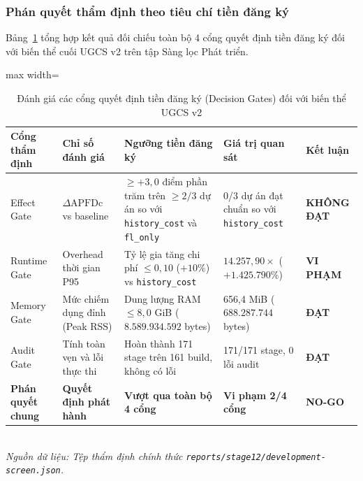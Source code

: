 \subsubsection{Phán quyết thẩm định theo tiêu chí tiền đăng ký}
\label{subsubsec:preregistered_decision}

Bảng~\ref{tab:decision_gates_evaluation} tổng hợp kết quả đối chiếu toàn bộ 4 cổng quyết định tiền đăng ký đối với biến thể cuối UGCS v2 trên tập Sàng lọc Phát triển.

\begin{table}[H]
\centering
\caption{Đánh giá các cổng quyết định tiền đăng ký (Decision Gates) đối với biến thể UGCS v2}
\label{tab:decision_gates_evaluation}
\small
\begin{adjustbox}{max width=\textwidth}
\begin{tabular}{llp{5.5cm}ll}
\toprule
\textbf{Cổng thẩm định} & \textbf{Chỉ số đánh giá} & \textbf{Ngưỡng tiền đăng ký} & \textbf{Giá trị quan sát} & \textbf{Kết luận} \\
\midrule
Effect Gate      & $\Delta\text{APFDc}$ vs baseline & $\ge +3,0$ điểm phần trăm trên $\ge 2/3$ dự án so với \texttt{history\_cost} và \texttt{fl\_only} & 0/3 dự án đạt chuẩn so với \texttt{history\_cost} & \textbf{KHÔNG ĐẠT} \\
Runtime Gate     & Overhead thời gian P95          & Tỷ lệ gia tăng chi phí $\le 0,10$ ($+10\%$) vs \texttt{history\_cost} & $14.257,90\times$ ($+1.425.790\%$) & \textbf{VI PHẠM} \\
Memory Gate      & Mức chiếm dụng đỉnh (Peak RSS)   & Dung lượng RAM $\le 8{,}0$ GiB ($8.589.934.592$ bytes) & 656,4 MiB ($688.287.744$ bytes) & \textbf{ĐẠT} \\
Audit Gate       & Tính toàn vẹn và lỗi thực thi   & Hoàn thành 171 stage trên 161 build, không có lỗi & 171/171 stage, 0 lỗi audit & \textbf{ĐẠT} \\
\midrule
\textbf{Phán quyết chung} & \textbf{Quyết định phát hành} & \textbf{Vượt qua toàn bộ 4 cổng} & \textbf{Vi phạm 2/4 cổng} & \textbf{NO-GO} \\
\bottomrule
\end{tabular}
\end{adjustbox}
\vspace{1mm}\\
\footnotesize{\textit{Nguồn dữ liệu: Tệp thẩm định chính thức \texttt{reports/stage12/development-screen.json}.}}
\end{table}


